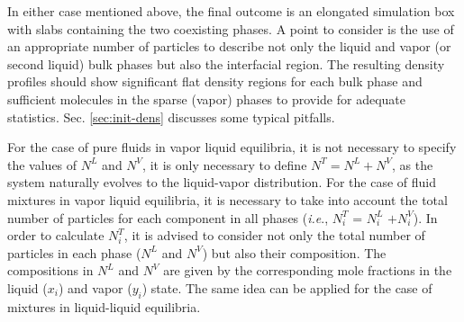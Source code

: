 \documentclass[9pt,tutorial]{livecoms}
\begin{document}

In either case mentioned above, the final outcome is an elongated simulation
box with slabs containing the two coexisting phases. A point to consider is the
use of an appropriate number of particles to describe not only the liquid and
vapor (or second liquid) bulk phases but also the interfacial region. The
resulting density profiles should show significant flat density regions for
each bulk phase and sufficient molecules in the sparse (vapor) phases to
provide for adequate statistics. Sec. \ref{sec:init-dens} discusses some typical
pitfalls.

For the case of pure fluids in vapor \textendash{} liquid equilibria, it is not
necessary to specify the values of $N^{L}$ and $N^{V}$, it is
only necessary to define $N^{T}= N^{L}+ N^{V}$,
as the system naturally evolves to the liquid-vapor distribution. For the case
of fluid mixtures in vapor \textendash{} liquid equilibria, it is necessary to
take into account the total number of particles for each component in all
phases (\textit{i.e}., $N_{i}^{T}$ = $N_{i}^{L}$
$+ N_{i}^{V}$). In order to calculate $N_{i}^{T}$, it is
advised to consider not only the total number of particles in each phase
($N^{L}$ and $N^{V}$) but also their composition. The
compositions in $N^{L}$ and $N^{V}$ are given by the
corresponding mole fractions in the liquid ($x_{i}$) and vapor
($y_{i}$) state. The same idea can be applied for the case of mixtures
in liquid-liquid equilibria.
\end{document}
